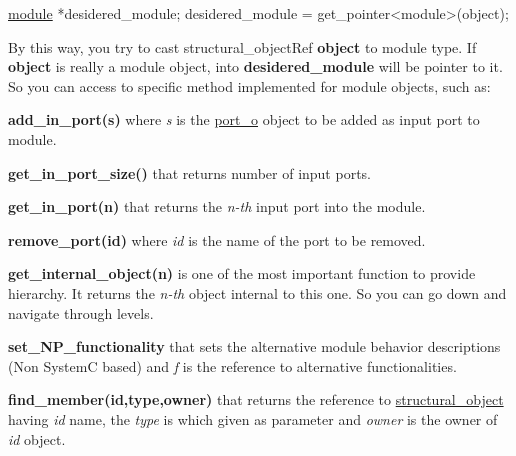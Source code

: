 \begin{DoxyCode}
\hyperlink{classmodule}{module} *desidered\_module;
desidered\_module = get\_pointer<module>(object);
\end{DoxyCode}
 By this way, you try to cast structural\+\_\+object\+Ref {\bfseries object} to module type. If {\bfseries object} is really a module object, into {\bfseries desidered\+\_\+module} will be pointer to it. So you can access to specific method implemented for module objects, such as\+:
\begin{DoxyItemize}
\item {\bfseries add\+\_\+in\+\_\+port(s)} where {\itshape s} is the \hyperlink{structport__o}{port\+\_\+o} object to be added as input port to module.
\item {\bfseries get\+\_\+in\+\_\+port\+\_\+size()} that returns number of input ports.
\item {\bfseries get\+\_\+in\+\_\+port(n)} that returns the {\itshape n-\/th} input port into the module.
\item {\bfseries remove\+\_\+port(id)} where {\itshape id} is the name of the port to be removed.
\item {\bfseries get\+\_\+internal\+\_\+object(n)} is one of the most important function to provide hierarchy. It returns the {\itshape n-\/th} object internal to this one. So you can go down and navigate through levels.
\item {\bfseries set\+\_\+\+N\+P\+\_\+functionality} that sets the alternative module behavior descriptions (Non SystemC based) and {\itshape f} is the reference to alternative functionalities.
\item {\bfseries find\+\_\+member(id,type,owner)} that returns the reference to \hyperlink{classstructural__object}{structural\+\_\+object} having {\itshape id} name, the {\itshape type} is which given as parameter and {\itshape owner} is the owner of {\itshape id} object.
\end{DoxyItemize}

